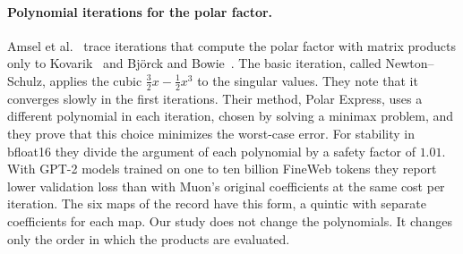 \documentclass{article}
\begin{document}
\paragraph{Polynomial iterations for the polar factor.} Amsel et al.~\cite{polar} trace iterations that compute the polar factor with matrix products only to Kovarik~\cite{kovarik} and Bj\"orck and Bowie~\cite{bjorck}. The basic iteration, called Newton--Schulz, applies the cubic $\tfrac{3}{2}x-\tfrac{1}{2}x^3$ to the singular values. They note that it converges slowly in the first iterations. Their method, Polar Express, uses a different polynomial in each iteration, chosen by solving a minimax problem, and they prove that this choice minimizes the worst-case error. For stability in bfloat16 they divide the argument of each polynomial by a safety factor of $1.01$. With GPT-2 models trained on one to ten billion FineWeb tokens they report lower validation loss than with Muon's original coefficients at the same cost per iteration. The six maps of the record have this form, a quintic with separate coefficients for each map. Our study does not change the polynomials. It changes only the order in which the products are evaluated.
\end{document}
